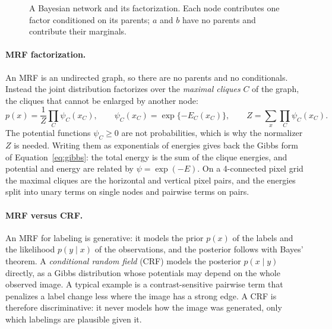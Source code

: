 \begin{figure}[ht]
  \centering
  \caption{A Bayesian network and its factorization. Each node contributes one
  factor conditioned on its parents; $a$ and $b$ have no parents and contribute
  their marginals.}
  \label{fig:bn-example}
\end{figure}

\paragraph{MRF factorization.}
An MRF is an undirected graph, so there are no parents and no conditionals.
Instead the joint distribution factorizes over the \emph{maximal cliques} $C$
of the graph, the cliques that cannot be enlarged by another node:
\begin{equation}
  p(x) = \frac1Z\prod_{C}\psi_C(x_C),
  \qquad
  \psi_C(x_C) = \exp\{-E_C(x_C)\},
  \qquad
  Z = \sum_x\prod_C\psi_C(x_C).
\end{equation}
\noindent
The potential functions $\psi_C\ge 0$ are not probabilities, which is why the
normalizer $Z$ is needed. Writing them as exponentials of energies gives back
the Gibbs form of Equation~\eqref{eq:gibbs}: the total energy is the sum of the
clique energies, and potential and energy are related by $\psi = \exp(-E)$. On a
4-connected pixel grid the maximal cliques are the horizontal and vertical pixel
pairs, and the energies split into unary terms on single nodes and pairwise
terms on pairs.

\paragraph{MRF versus CRF.}
An MRF for labeling is generative: it models the prior $p(x)$ of the labels and
the likelihood $p(y\mid x)$ of the observations, and the posterior follows with
Bayes' theorem. A \emph{conditional random field} (CRF) models the posterior
$p(x\mid y)$ directly, as a Gibbs distribution whose potentials may depend on
the whole observed image. A typical example is a contrast-sensitive pairwise
term that penalizes a label change less where the image has a strong edge. A
CRF is therefore discriminative: it never models how the image was generated,
only which labelings are plausible given it.

